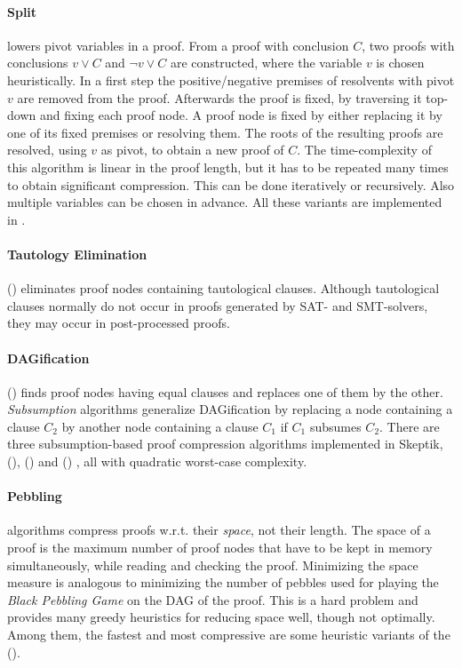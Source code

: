 \documentclass{llncs}
\begin{document}
\pskip

\paragraph{Split} \cite{CottonSplit} lowers pivot variables in a proof. 
From a proof with conclusion $C$, two proofs with conclusions $v \vee C$ and $\neg{v} \vee C$ are constructed,  where the variable $v$ is chosen heuristically.
In a first step the positive/negative premises of resolvents with pivot $v$ are removed from the proof.
Afterwards the proof is fixed, by traversing it top-down and fixing each proof node.
A proof node is fixed by either replacing it by one of its fixed premises or resolving them.
The roots of the resulting proofs are resolved, using $v$ as pivot, to obtain a new proof of $C$.
The time-complexity of this algorithm is linear in the proof length, but it has to be repeated many times to obtain significant compression. This can be done iteratively or recursively. Also multiple variables can be chosen in advance. 
All these variants are implemented in {\skeptik}.

\pskip

\paragraph{Tautology Elimination} () eliminates proof nodes containing tautological clauses. Although tautological clauses normally do not occur in proofs generated by SAT- and SMT-solvers, they may occur in post-processed proofs.

\pskip

\paragraph{DAGification} () finds proof nodes having equal clauses and replaces one of them by the other. 
%
\emph{Subsumption} algorithms generalize DAGification by replacing a node containing a clause $C_2$ by another node containing a clause $C_1$ if $C_1$ subsumes $C_2$.
There are three subsumption-based proof compression algorithms implemented in Skeptik,  (),  () and  () \cite{RP11}, all with quadratic worst-case complexity.
%
\pskip

\paragraph{Pebbling} algorithms 
compress proofs w.r.t. their \emph{space}, not their length. The space of a proof is the maximum number of proof nodes that have to be kept in memory simultaneously, while reading and checking the proof.
Minimizing the space measure is analogous to minimizing the number of pebbles used for playing the \emph{Black Pebbling Game} \cite{gilbert1980pebbling} on the DAG of the proof. This is a hard problem and {\skeptik} provides many greedy heuristics for reducing space well, though not optimally. Among them, the fastest and most compressive are some heuristic variants of the
 ().
\end{document}
